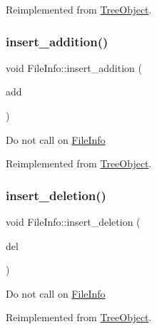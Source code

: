 Reimplemented from \mbox{\hyperlink{classTreeObject_af8cc57edba9f435b52ccf33cfbbb2fc6}{Tree\+Object}}.

\mbox{\label{classFileInfo_a7f788f31521c535646eebfa9959bbb24}} 
\subsubsection{\texorpdfstring{insert\+\_\+addition()}{insert\_addition()}}
{\footnotesize\ttfamily void File\+Info\+::insert\+\_\+addition (\begin{DoxyParamCaption}\item[{\mbox{\hyperlink{classTreeObject}{Tree\+Object}} $\ast$}]{add }\end{DoxyParamCaption})\hspace{0.3cm}{\ttfamily [virtual]}}

Do not call on \mbox{\hyperlink{classFileInfo}{File\+Info}} 

Reimplemented from \mbox{\hyperlink{classTreeObject_a41ce6080e0df5adcea4b0a76d35af885}{Tree\+Object}}.

\mbox{\label{classFileInfo_a278136b1d68f55dc56a4be807076fc0d}} 
\subsubsection{\texorpdfstring{insert\+\_\+deletion()}{insert\_deletion()}}
{\footnotesize\ttfamily void File\+Info\+::insert\+\_\+deletion (\begin{DoxyParamCaption}\item[{\mbox{\hyperlink{classTreeObject}{Tree\+Object}} $\ast$}]{del }\end{DoxyParamCaption})\hspace{0.3cm}{\ttfamily [virtual]}}

Do not call on \mbox{\hyperlink{classFileInfo}{File\+Info}} 

Reimplemented from \mbox{\hyperlink{classTreeObject_afcc4b3928d2b77ff080aa229a9706215}{Tree\+Object}}.

\mbox{\label{classFileInfo_a96827c2e48fb1a15d468e9afd545383e}} 
